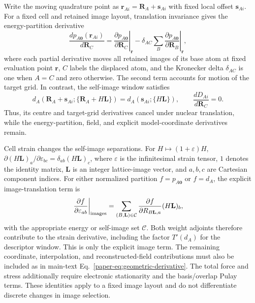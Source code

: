 \documentclass[10pt,a4paper]{article}
\begin{document}
Write the moving quadrature point as $\mathbf r_{Ai}=\mathbf R_A+\mathbf s_{Ai}$ with fixed local offset $\mathbf s_{Ai}$. For a fixed cell and retained image layout, translation invariance gives the energy-partition derivative
\begin{equation}
 \frac{dp_{A\mathbf0}(\mathbf r_{Ai})}{d\mathbf R_C}
 =\left.\frac{\partial p_{A\mathbf0}}{\partial\mathbf R_C}\right|_{\mathbf r}
 -\delta_{AC}\sum_B
       \left.\frac{\partial p_{A\mathbf0}}{\partial\mathbf R_B}\right|_{\mathbf r},
 \label{eq:moving-partition}
\end{equation}
where each partial derivative moves all retained images of its base atom at fixed evaluation point $\mathbf r$, $C$ labels the displaced atom, and the Kronecker delta $\delta_{AC}$ is one when $A=C$ and zero otherwise. The second term accounts for motion of the target grid. In contrast, the self-image window satisfies
\begin{equation}
 d_A(\mathbf R_A+\mathbf s_{Ai};\{\mathbf R_A+H\mathbf L\})
 =d_A(\mathbf s_{Ai};\{H\mathbf L\}),\qquad
 \frac{dD_{Ai}}{d\mathbf R_C}=0.
 \label{eq:self-window-translation}
\end{equation}
Thus, its centre and target-grid derivatives cancel under nuclear translation, while the energy-partition, field, and explicit model-coordinate derivatives remain.

Cell strain changes the self-image separations. For $H\mapsto(1+\varepsilon)H$, $\partial(H\mathbf L)_a/\partial\varepsilon_{bc}=\delta_{ab}(H\mathbf L)_c$, where $\varepsilon$ is the infinitesimal strain tensor, $1$ denotes the identity matrix, $\mathbf L$ is an integer lattice-image vector, and $a,b,c$ are Cartesian component indices. For either normalized partition $f=p_{A\mathbf0}$ or $f=d_A$, the explicit image-translation term is
\begin{equation}
 \left.\frac{\partial f}{\partial\varepsilon_{ab}}\right|_{\rm images}
 =\sum_{(B,\mathbf L)\in\mathcal C}
    \frac{\partial f}{\partial R_{B\mathbf L,a}}(H\mathbf L)_b,
 \label{eq:partition-image-strain}
\end{equation}
with the appropriate energy or self-image set $\mathcal C$. Both weight adjoints therefore contribute to the strain derivative, including the factor $T'(d_A)$ for the descriptor window. This is only the explicit image term. The remaining coordinate, interpolation, and reconstructed-field contributions must also be included as in main-text Eq.~\eqref{paper-eq:geometric-derivative}. The total force and stress additionally require electronic stationarity and the basis/overlap Pulay terms. These identities apply to a fixed image layout and do not differentiate discrete changes in image selection.
\end{document}
